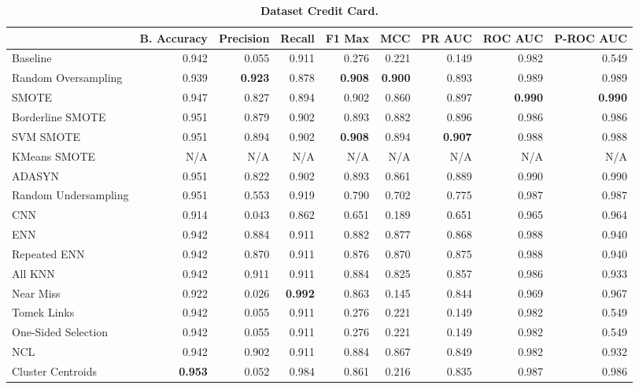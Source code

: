 \begin{table}[H]
    \centering
    \setlength\tabcolsep{2pt}
    \begin{tabularx}{\textwidth}{lRRRRRRRR}
        & B. Accuracy & Precision & Recall & F1 Max & MCC & PR AUC & ROC AUC & P-ROC AUC \\
        \midrule
        Baseline & 0.942 & 0.055 & 0.911 & 0.276 & 0.221 & 0.149 & 0.982 & 0.549 \\
        Random Oversampling & 0.939 & \textbf{0.923} & 0.878 & \textbf{0.908} & \textbf{0.900} & 0.893 & 0.989 & 0.989 \\
        SMOTE & 0.947 & 0.827 & 0.894 & 0.902 & 0.860 & 0.897 & \textbf{0.990} & \textbf{0.990} \\
        Borderline SMOTE & 0.951 & 0.879 & 0.902 & 0.893 & 0.882 & 0.896 & 0.986 & 0.986 \\
        SVM SMOTE & 0.951 & 0.894 & 0.902 & \textbf{0.908} & 0.894 & \textbf{0.907} & 0.988 & 0.988 \\
        KMeans SMOTE & N/A & N/A & N/A & N/A & N/A & N/A & N/A & N/A \\
        ADASYN & 0.951 & 0.822 & 0.902 & 0.893 & 0.861 & 0.889 & 0.990 & 0.990 \\
        Random Undersampling & 0.951 & 0.553 & 0.919 & 0.790 & 0.702 & 0.775 & 0.987 & 0.987 \\
        CNN & 0.914 & 0.043 & 0.862 & 0.651 & 0.189 & 0.651 & 0.965 & 0.964 \\
        ENN & 0.942 & 0.884 & 0.911 & 0.882 & 0.877 & 0.868 & 0.988 & 0.940 \\
        Repeated ENN & 0.942 & 0.870 & 0.911 & 0.876 & 0.870 & 0.875 & 0.988 & 0.940 \\
        All KNN & 0.942 & 0.911 & 0.911 & 0.884 & 0.825 & 0.857 & 0.986 & 0.933 \\
        Near Miss & 0.922 & 0.026 & \textbf{0.992} & 0.863 & 0.145 & 0.844 & 0.969 & 0.967 \\
        Tomek Links & 0.942 & 0.055 & 0.911 & 0.276 & 0.221 & 0.149 & 0.982 & 0.549 \\
        One-Sided Selection & 0.942 & 0.055 & 0.911 & 0.276 & 0.221 & 0.149 & 0.982 & 0.549 \\
        NCL & 0.942 & 0.902 & 0.911 & 0.884 & 0.867 & 0.849 & 0.982 & 0.932 \\
        Cluster Centroids & \textbf{0.953} & 0.052 & 0.984 & 0.861 & 0.216 & 0.835 & 0.987 & 0.986 \\
    \end{tabularx}
    \vspace{1mm}
    \caption{\textbf{Dataset Credit Card.}}
\end{table}
